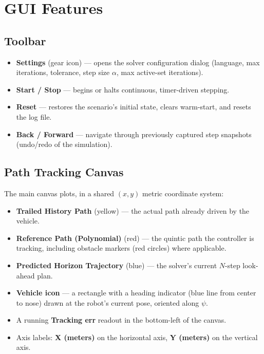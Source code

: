 ﻿\documentclass[11pt,a4paper]{article}
\begin{document}
\section{GUI Features}

\subsection{Toolbar}
\begin{itemize}[leftmargin=1.2cm]
  \item \textbf{Settings} (gear icon) --- opens the solver configuration dialog (language, max iterations, tolerance, step size $\alpha$, max active-set iterations).
  \item \textbf{Start / Stop} --- begins or halts continuous, timer-driven stepping.
  \item \textbf{Reset} --- restores the scenario's initial state, clears warm-start, and resets the log file.
  \item \textbf{Back / Forward} --- navigate through previously captured step snapshots (undo/redo of the simulation).
\end{itemize}

\subsection{Path Tracking Canvas}
The main canvas plots, in a shared $(x,y)$ metric coordinate system:
\begin{itemize}[leftmargin=1.2cm]
  \item \textbf{Trailed History Path} (yellow) --- the actual path already driven by the vehicle.
  \item \textbf{Reference Path (Polynomial)} (red) --- the quintic path the controller is tracking, including obstacle markers (red circles) where applicable.
  \item \textbf{Predicted Horizon Trajectory} (blue) --- the solver's current $N$-step look-ahead plan.
  \item \textbf{Vehicle icon} --- a rectangle with a heading indicator (blue line from center to nose) drawn at the robot's current pose, oriented along $\psi$.
  \item A running \textbf{Tracking err} readout in the bottom-left of the canvas.
  \item Axis labels: \textbf{X (meters)} on the horizontal axis, \textbf{Y (meters)} on the vertical axis.
\end{itemize}
\end{document}
